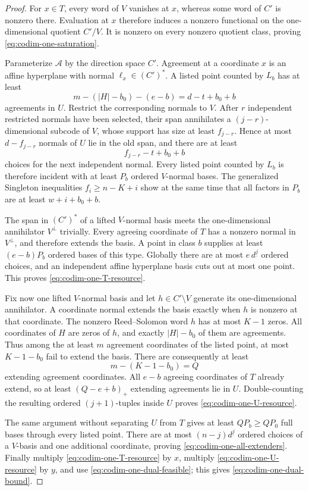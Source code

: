 \documentclass[11pt,a4paper]{amsart}
\numberwithin{equation}{section}
\theoremstyle{remark}
\begin{document}
\begin{proof}
For \(x\in T\), every word of \(V\) vanishes at \(x\), whereas some word
of \(C'\) is nonzero there.  Evaluation at \(x\) therefore induces a
nonzero functional on the one-dimensional quotient \(C'/V\).  It is
nonzero on every nonzero quotient class, proving
\eqref{eq:codim-one-saturation}.

Parameterize \(\mathcal A\) by the direction space \(C'\).  Agreement at
a coordinate \(x\) is an affine hyperplane with normal
\(\ell_x\in(C')^*\).  A listed point counted by \(L_b\) has at least
\[
 m-(|H|-b_0)-(e-b)=d-t+b_0+b
\]
agreements in \(U\).  Restrict the corresponding normals to \(V\).
After \(r\) independent restricted normals have been selected, their span
annihilates a \((j-r)\)-dimensional subcode of \(V\), whose support has
size at least \(f_{j-r}\).  Hence at most \(d-f_{j-r}\) normals of
\(U\) lie in the old span, and there are at least
\[
 f_{j-r}-t+b_0+b
\]
choices for the next independent normal.  Every listed point counted by
\(L_b\) is therefore incident with at least \(P_b\) ordered
\(V\)-normal bases.  The generalized Singleton inequalities
\(f_i\ge n-K+i\) show at the same time that all factors in \(P_b\) are
at least \(w+i+b_0+b\).

The span in \((C')^*\) of a lifted \(V\)-normal basis meets the
one-dimensional annihilator \(V^\perp\) trivially.  Every agreeing
coordinate of \(T\) has a nonzero normal in \(V^\perp\), and therefore
extends the basis.  A point in class \(b\) supplies at least
\((e-b)P_b\) ordered bases of this type.  Globally there are at most
\(e\,d^{\underline j}\) ordered choices, and an independent affine
hyperplane basis cuts out at most one point.  This proves
\eqref{eq:codim-one-T-resource}.

Fix now one lifted \(V\)-normal basis and let \(h\in C'\setminus V\)
generate its one-dimensional annihilator.  A coordinate normal extends
the basis exactly when \(h\) is nonzero at that coordinate.  The
nonzero Reed--Solomon word \(h\) has at most \(K-1\) zeros.  All
coordinates of \(H\) are zeros of \(h\), and exactly \(|H|-b_0\) of
them are agreements.  Thus among the at least \(m\) agreement coordinates
of the listed point, at most \(K-1-b_0\) fail to extend the basis.  There
are consequently at least
\[
 m-(K-1-b_0)=Q
\]
extending agreement coordinates.  All \(e-b\) agreeing coordinates of
\(T\) already extend, so at least \((Q-e+b)_+\) extending agreements lie
in \(U\).  Double-counting the resulting ordered \((j+1)\)-tuples inside
\(U\) proves \eqref{eq:codim-one-U-resource}.

The same argument without separating \(U\) from \(T\) gives at least
\(QP_b\ge QP_0\) full bases through every listed point.  There are at
most \((n-j)d^{\underline j}\) ordered choices of a \(V\)-basis and one
additional coordinate, proving \eqref{eq:codim-one-all-extenders}.
Finally multiply \eqref{eq:codim-one-T-resource} by \(x\), multiply
\eqref{eq:codim-one-U-resource} by \(y\), and use
\eqref{eq:codim-one-dual-feasible}; this gives
\eqref{eq:codim-one-dual-bound}.
\end{proof}
\end{document}
